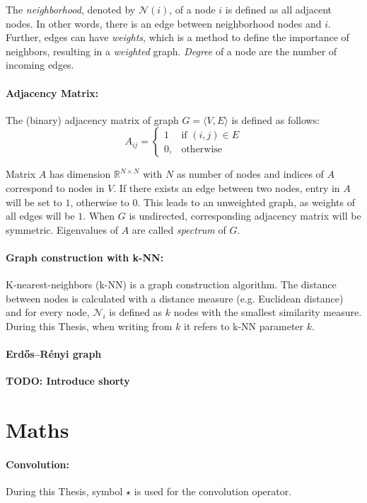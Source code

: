 The \textit{neighborhood}, denoted by $\mathcal{N}(i)$, of a node $i$  is defined as all adjacent nodes.
In other words, there is an edge between neighborhood nodes and $i$. 
Further, edges can have \textit{weights}, which is a method to define the importance of neighbors, resulting in a \textit{weighted} graph.
\textit{Degree} of a node are the number of incoming edges.

\paragraph{Adjacency Matrix:}
The (binary) adjacency matrix of graph $G = \langle V, E \rangle$ is defined as follows:
\begin{equation}
    \label{eg:AdjacencyMatrix}
    A_{ij} =    
    \begin{cases}
        1  & \text{if } (i, j) \in E \\
        0, & \text{otherwise}
    \end{cases}
\end{equation}

Matrix $A$ has dimension $\mathbb{R}^{N \times N}$ with $N$ as number of nodes
and indices of $A$ correspond to nodes in $V$.
If there exists an edge between two nodes, entry in $A$ will be set to $1$, otherwise to $0$.
This leads to an unweighted graph, as weights of all edges will be $1$.
When $G$ is undirected, corresponding adjacency matrix will be symmetric. 
Eigenvalues of $A$ are called \textit{spectrum} of $G$.

\paragraph{Graph construction with k-NN:}
K-nearest-neighbors (k-NN) is a graph construction algorithm. The distance between
nodes is calculated with a distance measure (e.g. Euclidean distance) and 
for every node, $\mathcal{N}_i$ is defined as $k$ nodes with the smallest similarity measure.
During this Thesis, when writing from $k$ it refers to k-NN parameter $k$.

\paragraph{Erdős–Rényi graph}
\textbf{TODO: Introduce shorty}

\section{Maths}
\paragraph{Convolution:}
During this Thesis, symbol $\star$ is used for the convolution operator.

